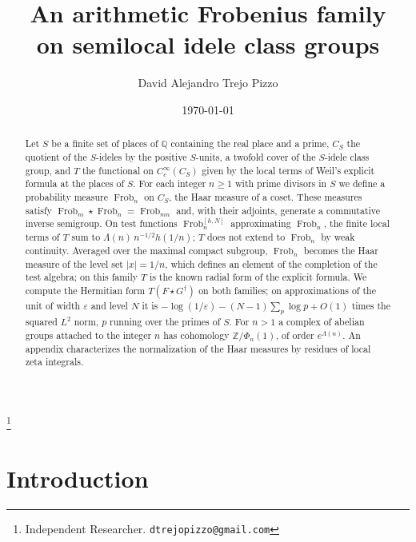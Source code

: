 \documentclass[11pt]{amsart}
\theoremstyle{definition}
\newcommand{\Z}{\mathbb Z}
\newcommand{\Q}{\mathbb Q}
\newcommand{\Frob}{\operatorname{Frob}}
\begin{document}
\title[An arithmetic Frobenius family]
{An arithmetic Frobenius family\\ on semilocal idele class groups}

\author{David Alejandro Trejo Pizzo}
\thanks{Independent Researcher. \texttt{dtrejopizzo@gmail.com}}

\date{\today}


\begin{abstract}
Let $S$ be a finite set of places of $\Q$ containing the real place and a
prime, $C_S$ the quotient of the $S$-ideles by the positive $S$-units, a
twofold cover of the $S$-idele class group, and
$T$ the functional on $C_c^\infty(C_S)$ given by the local terms of Weil's
explicit formula at the places of $S$. For each integer $n\ge1$ with prime
divisors in $S$ we define a probability measure $\Frob_n$ on $C_S$, the Haar
measure of a coset. These measures satisfy
$\Frob_m\star\Frob_n=\Frob_{mn}$ and, with their adjoints, generate a
commutative inverse semigroup. On test functions $\Frob_n^{[h,N]}$
approximating $\Frob_n$, the finite local terms of $T$
sum to $\Lambda(n)\,n^{-1/2}h(1/n)$; $T$ does not extend to $\Frob_n$ by
weak continuity. Averaged over the maximal compact subgroup, $\Frob_n$
becomes the Haar measure of the level set $|x|=1/n$, which defines an element
of the completion of the test algebra; on this family $T$ is the known
radial form of the explicit formula. We compute the Hermitian form
$T(F\star G^\dagger)$ on both families; on approximations of the unit of
width $\varepsilon$ and level $N$ it is
$-\log(1/\varepsilon)-(N-1)\sum_{p}\log p+O(1)$ times the squared $L^2$
norm, $p$ running over the primes of $S$. For $n>1$ a complex of abelian
groups attached to the integer $n$ has cohomology $\Z/\Phi_n(1)$, of order
$e^{\Lambda(n)}$. An appendix characterizes the normalization of the Haar
measures by residues of local zeta integrals.
\end{abstract}

\maketitle

\setcounter{tocdepth}{1}
\tableofcontents

\section{Introduction}
\end{document}
